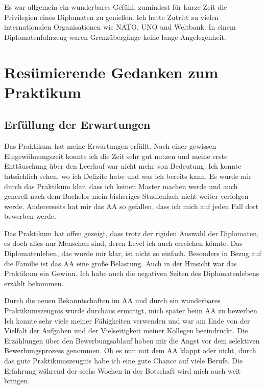 \documentclass[12pt,a4paper, headsepline]{scrartcl}
\begin{document}
Es war allgemein ein wunderbares Gefühl, zumindest für kurze Zeit die Privilegien eines Diplomaten zu genießen. Ich hatte Zutritt zu vielen internationalen Organisationen wie NATO, UNO und Weltbank. In einem Diplomatenfahrzeug  waren Grenzübergänge keine lange Angelegenheit.  

\newpage
\section{Resümierende Gedanken zum Praktikum}

\subsection{Erfüllung der Erwartungen}
Das Praktikum hat meine Erwartungen erfüllt. Nach einer gewissen Eingewöhnungszeit konnte ich die Zeit sehr gut nutzen und meine erste Enttäuschung über den Leerlauf war nicht mehr von Bedeutung. Ich konnte tatsächlich sehen, wo ich Defizite habe und was ich bereits kann. Es wurde mir durch das Praktikum klar, dass ich keinen Master machen werde und auch generell nach dem Bachelor mein bisheriges Studienfach nicht weiter verfolgen werde. Andererseits hat mir das AA so gefallen, dass ich mich auf jeden Fall dort bewerben werde.

Das Praktikum hat offen gezeigt, dass trotz der rigiden Auswahl der Diplomaten, es doch alles nur Menschen sind, deren Level ich auch erreichen könnte. Das Diplomatenleben, das wurde mir klar, ist nicht so einfach. Besonders in Bezug auf die Familie ist das AA eine große Belastung. Auch in der Hinsicht war das Praktikum ein Gewinn. Ich habe auch die negativen Seiten des Diplomatenlebens erzählt bekommen.

Durch die neuen Bekanntschaften im AA und durch ein wunderbares Praktikumszeugnis wurde durchaus ermutigt, mich später beim AA zu bewerben. Ich konnte sehr viele meiner Fähigkeiten verwenden und war am Ende von der Vielfalt der Aufgaben und der Vielseitigkeit meiner Kollegen beeindruckt. Die Erzählungen über den Bewerbungsablauf haben mir die Angst vor dem selektiven Bewerbungsprozess genommen. Ob es nun mit dem AA klappt oder nicht, durch das gute Praktikumszeugnis habe ich eine gute Chance auf viele Berufe. Die Erfahrung während der sechs Wochen in der Botschaft wird mich auch weit bringen.
\end{document}
